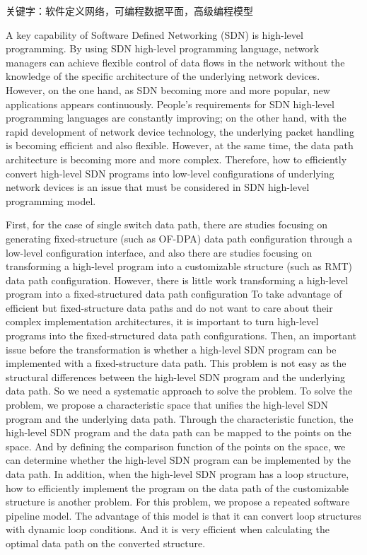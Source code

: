 \documentclass{ctexart}
\begin{document}
关键字：软件定义网络，可编程数据平面，高级编程模型


A key capability of Software Defined Networking (SDN) is high-level programming. By using SDN high-level programming language, network managers can achieve flexible control of data flows in the network without the knowledge of the specific architecture of the underlying network devices. However, on the one hand, as SDN becoming more and more popular, new applications appears continuously. People's requirements for SDN high-level programming languages ​​are constantly improving; on the other hand, with the rapid development of network device technology, the underlying packet handling is becoming efficient and also flexible. However, at the same time, the data path architecture is becoming more and more complex. Therefore, how to efficiently convert high-level SDN programs into low-level configurations of underlying network devices is an issue that must be considered in SDN high-level programming model.



First, for the case of single switch data path, there are studies focusing on generating fixed-structure (such as OF-DPA) data path configuration through a low-level configuration interface, and also there are studies focusing on transforming a high-level program into a customizable structure (such as RMT) data path configuration. However, there is little work transforming a high-level program into a fixed-structured data path configuration To take advantage of efficient but fixed-structure data paths and do not want to care about their complex implementation architectures, it is important to turn high-level programs into the fixed-structured data path configurations. Then, an important issue before the transformation is whether a high-level SDN program can be implemented with a fixed-structure data path. This problem is not easy as the structural differences between the high-level SDN program and the underlying data path. So we need a systematic approach to solve the problem. To solve the problem, we propose a characteristic space that unifies the high-level SDN program and the underlying data path. Through the characteristic function, the high-level SDN program and the data path can be mapped to the points on the space. And by defining the comparison function of the points on the space, we can determine whether the high-level SDN program can be implemented by the data path. In addition, when the high-level SDN program has a loop structure, how to efficiently implement the program on the data path of the customizable structure is another problem. For this problem, we propose a repeated software pipeline model. The advantage of this model is that it can convert loop structures with dynamic loop conditions. And it is very efficient when calculating the optimal data path on the converted structure.
\end{document}

